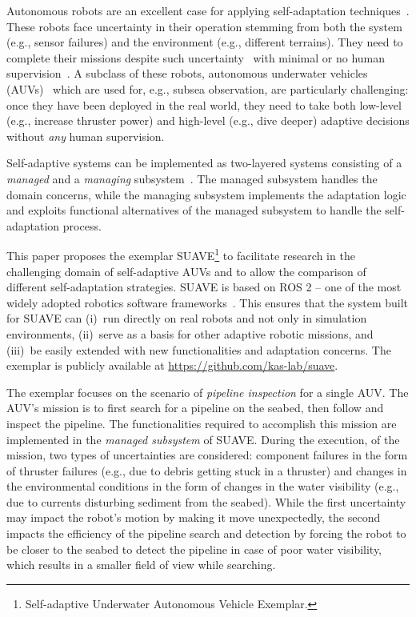 Autonomous robots are an excellent case for applying self-adaptation
techniques~\cite{edwardsArchDrivenRobotics,CAMARASoftwareArchitectureTask2020,park2012task,shin_platooning_2021,askarpour_robomax_2021,undersea,ACROS}. These
robots face uncertainty in their operation stemming from both the
system (e.g., sensor failures) and the environment (e.g., different
terrains). They need to complete their missions despite such
uncertainty~\cite{Ludvigsen-2021} with minimal or no human supervision~\cite{Huang-2004}.  A subclass of these robots, autonomous underwater
vehicles (AUVs)~\cite{Wynn-2014} which are used for, e.g., subsea
observation, are particularly challenging: once they have been
deployed in the real world, they need to take both low-level (e.g.,
increase thruster power) and high-level (e.g., dive deeper) adaptive
decisions without \emph{any} human supervision.

Self-adaptive systems can be implemented as two-layered systems
consisting of a \emph{managed} and a \emph{managing}
subsystem~\cite{weyns2020introduction}. The managed subsystem handles
the domain concerns, while the managing subsystem implements the
adaptation logic and exploits functional alternatives of the managed
subsystem to handle the self-adaptation process.

This paper proposes the exemplar SUAVE\footnote{ Self-adaptive
  Underwater Autonomous Vehicle Exemplar.} to facilitate research in
the challenging domain of self-adaptive AUVs and to allow the
comparison of different self-adaptation strategies.  SUAVE is based
on ROS 2 -- one of the most widely adopted robotics software %
frameworks~\cite{ros2}. This ensures that
the system built for SUAVE can (i)~run directly on real robots and
not only in simulation environments, (ii)~serve as a basis for other
adaptive robotic missions, and (iii)~be easily extended with new
functionalities and adaptation concerns. The exemplar is publicly
available at \url{https://github.com/kas-lab/suave}.


The exemplar focuses on the scenario of \emph{pipeline inspection} for
a single AUV\@.  The AUV's mission is to first search for a pipeline on
the seabed, then follow and inspect the pipeline. The functionalities
required to accomplish this mission are implemented in the
\emph{managed subsystem} of SUAVE\@.  During the execution, of the
mission, two types of uncertainties are considered: component failures
in the form of thruster failures (e.g., due to debris getting stuck in
a thruster) and changes in the environmental conditions in the form of
changes in the water visibility (e.g., due to currents disturbing
sediment from the seabed). While the first uncertainty may impact the
robot's motion by making it move unexpectedly, the second impacts the
efficiency of the pipeline search and detection by forcing the robot
to be closer to the seabed to detect the pipeline in case of poor
water visibility, which results in a smaller field of view while
searching.

